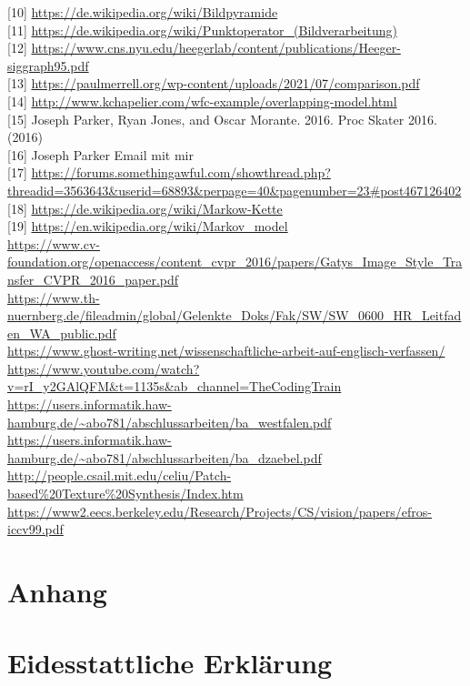 \documentclass[12pt]{report}
\begin{document}
{[10]} \url{https://de.wikipedia.org/wiki/Bildpyramide}\\
{[11]} \url{https://de.wikipedia.org/wiki/Punktoperator_(Bildverarbeitung)}\\
{[12]} \url{https://www.cns.nyu.edu/heegerlab/content/publications/Heeger-siggraph95.pdf}\\
{[13]} \url{https://paulmerrell.org/wp-content/uploads/2021/07/comparison.pdf}\\
{[14]} \url{http://www.kchapelier.com/wfc-example/overlapping-model.html}\\
{[15]} {Joseph Parker, Ryan Jones, and Oscar Morante. 2016. Proc Skater 2016. (2016)}\\
{[16]} {Joseph Parker Email mit mir}\\
{[17]} \url{https://forums.somethingawful.com/showthread.php?threadid=3563643&userid=68893&perpage=40&pagenumber=23#post467126402}\\
{[18]} \url{https://de.wikipedia.org/wiki/Markow-Kette}\\
{[19]} \url{https://en.wikipedia.org/wiki/Markov_model}\\
\url{https://www.cv-foundation.org/openaccess/content_cvpr_2016/papers/Gatys_Image_Style_Transfer_CVPR_2016_paper.pdf}\\
\url{https://www.th-nuernberg.de/fileadmin/global/Gelenkte_Doks/Fak/SW/SW_0600_HR_Leitfaden_WA_public.pdf}\\
\url{https://www.ghost-writing.net/wissenschaftliche-arbeit-auf-englisch-verfassen/}\\
\url{https://www.youtube.com/watch?v=rI_y2GAlQFM&t=1135s&ab_channel=TheCodingTrain}\\
\url{https://users.informatik.haw-hamburg.de/~abo781/abschlussarbeiten/ba_westfalen.pdf}\\
\url{https://users.informatik.haw-hamburg.de/~abo781/abschlussarbeiten/ba_dzaebel.pdf}\\
\url{http://people.csail.mit.edu/celiu/Patch-based%20Texture%20Synthesis/Index.htm}\\
\url{https://www2.eecs.berkeley.edu/Research/Projects/CS/vision/papers/efros-iccv99.pdf}\\


{\let\clearpage\relax\chapter{Anhang}}
{\let\clearpage\relax\chapter{Eidesstattliche Erklärung}}
\end{document}
